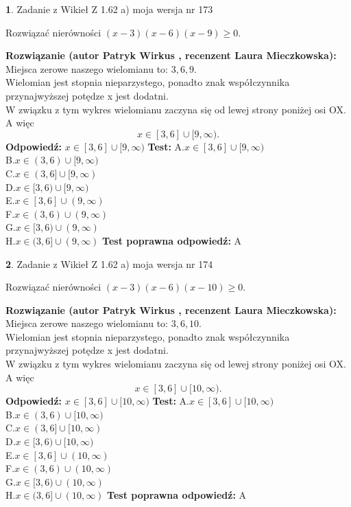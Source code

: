 \documentclass[12pt, a4paper]{article}
\theoremstyle{definition} %
\newtheorem{zad}{}
\newcommand{\zadStart}[1]{\begin{zad}#1\newline}
\newcommand{\zadStop}{\end{zad}}
\newcommand{\rozwStart}[2]{\noindent \textbf{Rozwiązanie (autor #1 , recenzent #2): }\newline}
\newcommand{\rozwStop}{\newline}
\newcommand{\odpStart}{\noindent \textbf{Odpowiedź:}\newline}
\newcommand{\odpStop}{\newline}
\newcommand{\testStart}{\noindent \textbf{Test:}\newline}
\newcommand{\testStop}{\newline}
\newcommand{\kluczStart}{\noindent \textbf{Test poprawna odpowiedź:}\newline}
\newcommand{\kluczStop}{\newline}
\begin{document}
\zadStart{Zadanie z Wikieł Z 1.62 a) moja wersja nr 173}

Rozwiązać nierówności $(x-3)(x-6)(x-9)\ge0$.
\zadStop
\rozwStart{Patryk Wirkus}{Laura Mieczkowska}
Miejsca zerowe naszego wielomianu to: $3, 6, 9$.\\
Wielomian jest stopnia nieparzystego, ponadto znak współczynnika przy\linebreak najwyższej potędze x jest dodatni.\\ W związku z tym wykres wielomianu zaczyna się od lewej strony poniżej osi OX. A więc $$x \in [3,6] \cup [9,\infty).$$
\rozwStop
\odpStart
$x \in [3,6] \cup [9,\infty)$
\odpStop
\testStart
A.$x \in [3,6] \cup [9,\infty)$\\
B.$x \in (3,6) \cup [9,\infty)$\\
C.$x \in (3,6] \cup [9,\infty)$\\
D.$x \in [3,6) \cup [9,\infty)$\\
E.$x \in [3,6] \cup (9,\infty)$\\
F.$x \in (3,6) \cup (9,\infty)$\\
G.$x \in [3,6) \cup (9,\infty)$\\
H.$x \in (3,6] \cup (9,\infty)$
\testStop
\kluczStart
A
\kluczStop



\zadStart{Zadanie z Wikieł Z 1.62 a) moja wersja nr 174}

Rozwiązać nierówności $(x-3)(x-6)(x-10)\ge0$.
\zadStop
\rozwStart{Patryk Wirkus}{Laura Mieczkowska}
Miejsca zerowe naszego wielomianu to: $3, 6, 10$.\\
Wielomian jest stopnia nieparzystego, ponadto znak współczynnika przy\linebreak najwyższej potędze x jest dodatni.\\ W związku z tym wykres wielomianu zaczyna się od lewej strony poniżej osi OX. A więc $$x \in [3,6] \cup [10,\infty).$$
\rozwStop
\odpStart
$x \in [3,6] \cup [10,\infty)$
\odpStop
\testStart
A.$x \in [3,6] \cup [10,\infty)$\\
B.$x \in (3,6) \cup [10,\infty)$\\
C.$x \in (3,6] \cup [10,\infty)$\\
D.$x \in [3,6) \cup [10,\infty)$\\
E.$x \in [3,6] \cup (10,\infty)$\\
F.$x \in (3,6) \cup (10,\infty)$\\
G.$x \in [3,6) \cup (10,\infty)$\\
H.$x \in (3,6] \cup (10,\infty)$
\testStop
\kluczStart
A
\kluczStop
\end{document}
